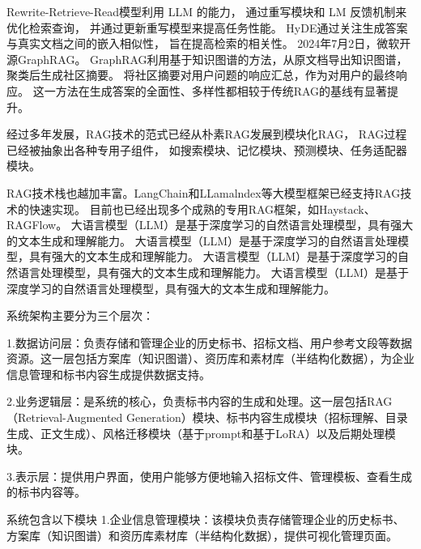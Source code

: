 \documentclass{xmu}
\begin{document}
Rewrite-Retrieve-Read模型利用 LLM 的能力，
通过重写模块和 LM 反馈机制来优化检索查询，
并通过更新重写模型来提高任务性能\cite{RRR}。
HyDE通过关注生成答案与真实文档之间的嵌入相似性，
旨在提高检索的相关性\cite{HyDE}。
2024年7月2日，微软开源GraphRAG\cite{graphRAG}。
GraphRAG利用基于知识图谱的方法，从原文档导出知识图谱，聚类后生成社区摘要。
将社区摘要对用户问题的响应汇总，作为对用户的最终响应。
这一方法在生成答案的全面性、多样性都相较于传统RAG的基线有显著提升。

经过多年发展，RAG技术的范式已经从朴素RAG发展到模块化RAG，
RAG过程已经被抽象出各种专用子组件，
如搜索模块、记忆模块、预测模块、任务适配器模块。\cite{RAG}

RAG技术栈也越加丰富。LangChain和LLamalndex等大模型框架已经支持RAG技术的快速实现。
目前也已经出现多个成熟的专用RAG框架，如Haystack、RAGFlow。
大语言模型（LLM）是基于深度学习的自然语言处理模型，具有强大的文本生成和理解能力。
大语言模型（LLM）是基于深度学习的自然语言处理模型，具有强大的文本生成和理解能力。
大语言模型（LLM）是基于深度学习的自然语言处理模型，具有强大的文本生成和理解能力。
大语言模型（LLM）是基于深度学习的自然语言处理模型，具有强大的文本生成和理解能力。


系统架构主要分为三个层次：

1.数据访问层：负责存储和管理企业的历史标书、招标文档、用户参考文段等数据资源。这一层包括方案库（知识图谱）、资历库和素材库（半结构化数据），为企业信息管理和标书内容生成提供数据支持。

2.业务逻辑层：是系统的核心，负责标书内容的生成和处理。这一层包括RAG（Retrieval-Augmented Generation）模块、标书内容生成模块（招标理解、目录生成、正文生成）、风格迁移模块（基于prompt和基于LoRA）以及后期处理模块。

3.表示层：提供用户界面，使用户能够方便地输入招标文件、管理模板、查看生成的标书内容等。

系统包含以下模块
1.企业信息管理模块：该模块负责存储管理企业的历史标书、方案库（知识图谱）和资历库素材库（半结构化数据），提供可视化管理页面。
\end{document}
